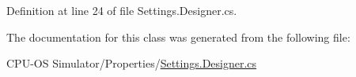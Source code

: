 Definition at line 24 of file Settings.\+Designer.\+cs.



The documentation for this class was generated from the following file\+:\begin{DoxyCompactItemize}
\item 
C\+P\+U-\/\+O\+S Simulator/\+Properties/\hyperlink{_c_p_u-_o_s_01_simulator_2_properties_2_settings_8_designer_8cs}{Settings.\+Designer.\+cs}\end{DoxyCompactItemize}
